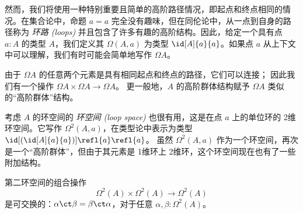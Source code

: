 然而，我们将使用一种特别重要且简单的高阶路径情况，即起点和终点相同的情况。在集合论中，命题 $a=a$ 完全没有趣味，但在同伦论中，从一点到自身的路径称为 \emph{环路 (loops)} 并且包含了许多有趣的高阶结构。因此，给定一个具有点 $a:A$ 的类型 $A$，我们定义其 
%
$\Omega(A,a)$ 为类型 $\id[A]{a}{a}$。如果点 $a$ 从上下文中可以理解，我们有时可能会简单地写作 $\Omega A$。

由于 $\Omega A$ 的任意两个元素是具有相同起点和终点的路径，它们可以连接；
因此我们有一个操作 $\Omega A\times \Omega A\to \Omega A$。
更一般地，$A$ 的高阶群体结构赋予 $\Omega A$ 类似的“高阶群体”结构。

考虑 $A$ 的环空间的 \emph{环空间 (loop space)} 也很有用，这是在点 $a$ 上的单位环的 2维环空间。它写作 $\Omega^2(A,a)$，在类型论中表示为类型 $\id[({\id[A]{a}{a}})]{\refl{a}}{\refl{a}}$。
虽然 $\Omega^2(A,a)$ 作为一个环空间，再次是一个“高阶群体”，但由于其元素是 1维环上 2维环，这个环空间现在也有了一些附加结构。

\begin{thm}\label{thm:EckmannHilton}
第二环空间的组合操作
%
\begin{equation*}
  \Omega^2(A)\times \Omega^2(A)\to \Omega^2(A)
\end{equation*}
是可交换的：$\alpha\ct\beta = \beta\ct\alpha$，对于任意 $\alpha, \beta:\Omega^2(A)$。
%
\end{thm}

